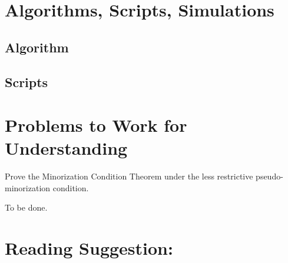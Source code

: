 \documentclass[12pt]{article}
\begin{document}
\section*{Algorithms, Scripts, Simulations}

\subsection*{Algorithm}

\subsection*{Scripts}

% 

\hr

\section*{Problems to Work for Understanding}
\renewcommand{\theexerciseseries}{}
\renewcommand{\theexercise}{\arabic{exercise}}

\begin{exercise}
    Prove the Minorization Condition Theorem under the less restrictive
    pseudo-minorization condition.
\end{exercise}
\begin{solution}
    To be done.
\end{solution}

\hr

\section*{Reading Suggestion:}


\end{document}
